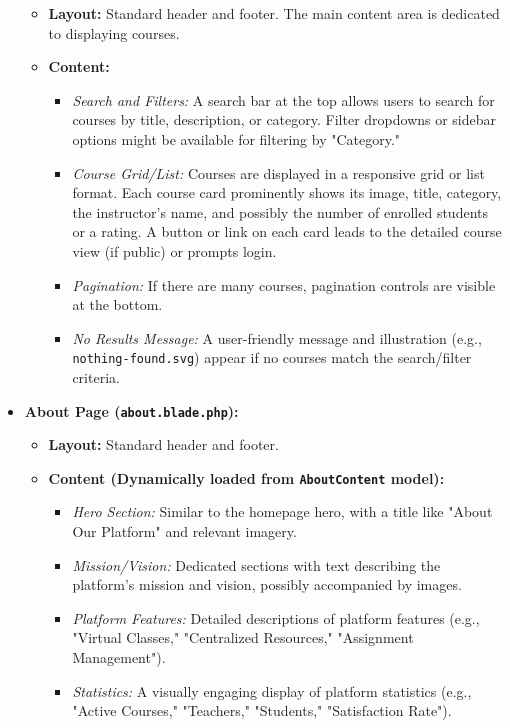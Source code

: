 \begin{itemize}
    \begin{itemize}
        \item \textbf{Layout:} Standard header and footer. The main content area is dedicated to displaying courses.
        \item \textbf{Content:}
        \begin{itemize}
            \item \textit{Search and Filters:} A search bar at the top allows users to search for courses by title, description, or category. Filter dropdowns or sidebar options might be available for filtering by "Category."
            \item \textit{Course Grid/List:} Courses are displayed in a responsive grid or list format. Each course card prominently shows its image, title, category, the instructor's name, and possibly the number of enrolled students or a rating. A button or link on each card leads to the detailed course view (if public) or prompts login.
            \item \textit{Pagination:} If there are many courses, pagination controls are visible at the bottom.
            \item \textit{No Results Message:} A user-friendly message and illustration (e.g., \texttt{nothing-found.svg}) appear if no courses match the search/filter criteria.
        \end{itemize}
    \end{itemize}
    \item \textbf{About Page (\texttt{about.blade.php}):}
    \begin{itemize}
        \item \textbf{Layout:} Standard header and footer.
        \item \textbf{Content (Dynamically loaded from \texttt{AboutContent} model):}
        \begin{itemize}
            \item \textit{Hero Section:} Similar to the homepage hero, with a title like "About Our Platform" and relevant imagery.
            \item \textit{Mission/Vision:} Dedicated sections with text describing the platform's mission and vision, possibly accompanied by images.
            \item \textit{Platform Features:} Detailed descriptions of platform features (e.g., "Virtual Classes," "Centralized Resources," "Assignment Management").
            \item \textit{Statistics:} A visually engaging display of platform statistics (e.g., "Active Courses," "Teachers," "Students," "Satisfaction Rate").

\end{itemize}
\end{itemize}
\end{itemize}
